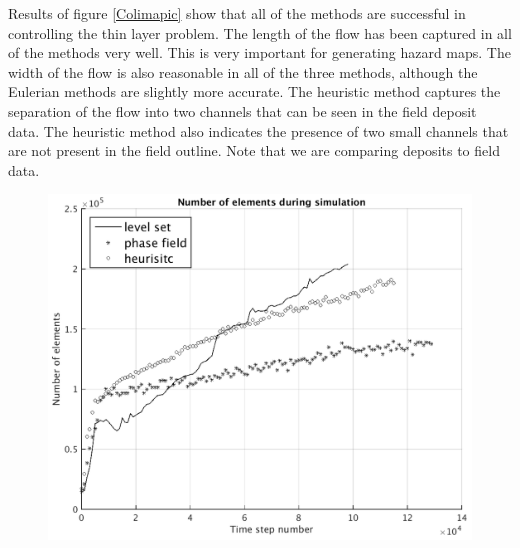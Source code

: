 \documentclass[review]{elsarticle}
\begin{document}
Results of figure \ref{Colimapic} show that all of the methods are successful in controlling the thin layer problem. 
The length of the flow has been captured in all of the methods very well.  This is very important for generating hazard maps. 
The width of the flow is also reasonable in all of the three methods, although the Eulerian methods are slightly more accurate.
The heuristic method captures the separation of the flow into two channels that can be seen in the field deposit data. The heuristic method 
also indicates the presence of two small channels that are not present in the field outline. Note that we are comparing deposits to 
field data.
\begin{figure}[H]
        \begin{minipage}[b]{.5\linewidth}
                \centering
                \includegraphics[width=1\textwidth]{IMAGES/colima_num_elem.png}
                \label{col_amr}
                

\end{minipage}
\end{figure}
\end{document}
